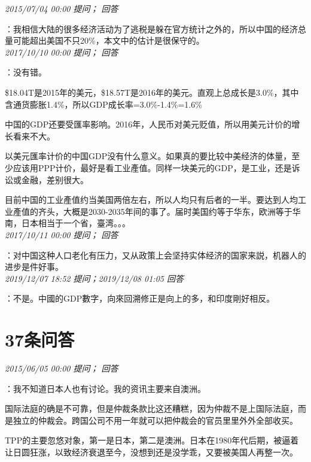 \documentclass[twocolumn]{ctexart}
\begin{document}
\textit{\hfill\noindent\small 2015/07/04 00:00 提问； 回答}

：我相信大陆的很多经济活动为了逃税是躲在官方统计之外的，所以中国的经济总量可能超出美国不只20\%，本文中的估计是很保守的。\\

\textit{\hfill\noindent\small 2017/10/10 00:00 提问； 回答}

：没有错。

\$18.04T是2015年的美元，\$18.57T是2016年的美元。直观上总成长是3.0\%，其中含通货膨胀1.4\%，所以GDP成长率=3.0\%-1.4\%=1.6\%

中国的GDP还要受匯率影响。2016年，人民币对美元贬值，所以用美元计价的增长看来不大。

以美元匯率计价的中国GDP没有什么意义。如果真的要比较中美经济的体量，至少应该用PPP计价，最好是看工业產值。同样一块美元的GDP，是工业，还是诉讼或金融，差别很大。

目前中国的工业產值约当美国两倍左右，所以人均只有后者的一半。要达到人均工业產值的齐头，大概是2030-2035年间的事了。届时美国约等于华东，欧洲等于华南，日本相当于一个省，臺湾。。。\\

\textit{\hfill\noindent\small 2017/10/11 00:00 提问； 回答}

：对中国这种人口老化有压力，又从政策上会坚持实体经济的国家来説，机器人的进步是件好事。\\

\textit{\hfill\noindent\small 2019/12/07 18:52 提问；2019/12/08 01:05 回答}

：不是。中國的GDP數字，向來回溯修正是向上的多，和印度剛好相反。
\\

\section{37条问答}

\textit{\hfill\noindent\small 2015/06/05 00:00 提问； 回答}

：我不知道日本人也有讨论。我的资讯主要来自澳洲。

国际法庭的确是不可靠，但是仲裁条款比这还糟糕，因为仲裁不是上国际法庭，而是独立的仲裁会。跨国公司不用一年就可以把仲裁会的官员里里外外全部收买。

TPP的主要忽悠对象，第一是日本，第二是澳洲。日本在1980年代后期，被逼着让日圆狂涨，以致经济衰退至今，没想到还是没学乖，又要被美国人再整一次。\\
\end{document}
